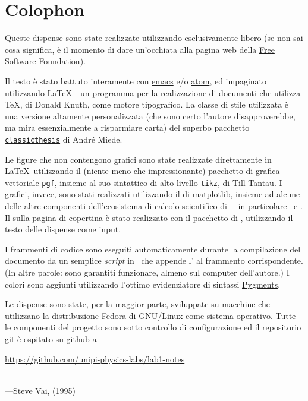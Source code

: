 \chapter*{Colophon}

Queste dispense sono state realizzate utilizzando esclusivamente 
libero (se non sai cosa significa, è il momento di dare un'occhiata alla
pagina web della \href{http://www.fsf.org/}{Free Software Foundation}).

Il testo è stato battuto interamente con
\href{https://www.gnu.org/software/emacs/}{emacs} e/o \href{https://atom.io/}{atom},
ed impaginato utilizzando \href{https://www.latex-project.org/}{\LaTeX}---un programma
per la realizzazione di documenti che utilizza \TeX, di Donald Knuth, come motore
tipografico. La classe di stile utilizzata è una versione altamente
personalizzata (che sono certo l'autore disapproverebbe, ma mira essenzialmente
a risparmiare carta) del superbo pacchetto
\href{http://www.ctan.org/tex-archive/macros/latex/contrib/classicthesis/}{\texttt{classicthesis}} di André Miede.

Le figure che non contengono grafici sono state realizzate direttamente in
\LaTeX\ utilizzando il (niente meno che impressionante) pacchetto di grafica
vettoriale \href{https://www.ctan.org/pkg/pgf}{\texttt{pgf}}, insieme al suo
 sintattico di alto livello
\href{http://www.texample.net/tikz/}{\texttt{tikz}}, di Till Tantau.
I grafici, invece, sono stati realizzati utilizzando il 
 di \href{http://matplotlib.org/}{matplotlib}, insieme ad alcune
delle altre componenti dell'ecosistema di calcolo scientifico di
\python---in particolare \numpy\ e \scipy.
Il  sulla pagina di copertina è stato realizzato con il pacchetto
\href{https://github.com/amueller/word_cloud}{} di \python,
utilizzando il testo delle dispense come input.

I frammenti di codice sono eseguiti automaticamente durante la compilazione
del documento da un semplice \emph{script} in \python\ che appende l'
al frammento corrispondente. (In altre parole: sono garantiti funzionare,
almeno sul computer dell'autore.) I colori sono aggiunti utilizzando
l'ottimo evidenziatore di sintassi \href{http://pygments.org/}{Pygments}.

Le dispense sono state, per la maggior parte, sviluppate su macchine che
utilizzano la distribuzione \href{https://getfedora.org/}{Fedora} di GNU/Linux
come sistema operativo. Tutte le componenti del progetto sono sotto controllo
di configurazione ed il repositorio \href{https://git-scm.com/}{git} è
ospitato su \href{https://github.com}{github} a
\begin{center}
  \url{https://github.com/unipi-physics-labs/lab1-notes}
\end{center}


\vfill

\noindent{}\\
---Steve Vai,  (1995)
